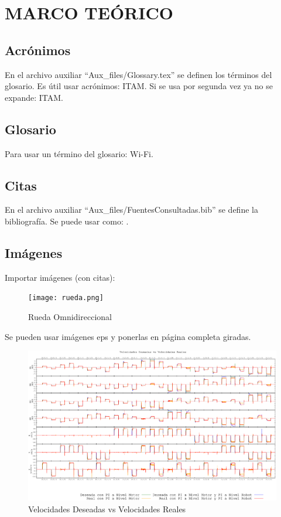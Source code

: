 \chapter{MARCO TEÓRICO}
\label{ch2:MarcoTeorico}

\section{Acrónimos}
En el archivo auxiliar ``Aux\_files/Glossary.tex'' se definen los términos del glosario.
Es útil usar acrónimos: \gls{ITAM}. Si se usa por segunda vez ya no se expande: \gls{ITAM}. 

\section{Glosario}
Para usar un término del glosario: \gls{Wi-Fi}.

\section{Citas}
En el archivo auxiliar ``Aux\_files/FuentesConsultadas.bib'' se define la bibliografía. Se puede usar como: \cite{turing2009computing}.


\section{Imágenes}
Importar imágenes (con citas):

\label{robocup-ssl}
\begin{figure}
	\centering
		\texttt{[image: rueda.png]}
	\caption{Rueda Omnidireccional \protect\cite{itam-gary} }
	\label{fig:SP}
\end{figure}

Se pueden usar imágenes eps y ponerlas en página completa giradas.
\begin{figure}
	\centering
		\includegraphics[width=\textwidth,height=0.9\textheight]{Figures/160517-vels-motVSmotrob_slide.eps}
	\caption{Velocidades Deseadas vs Velocidades Reales}
	\label{fig:vels_real_vs_des_mot}
\end{figure}



